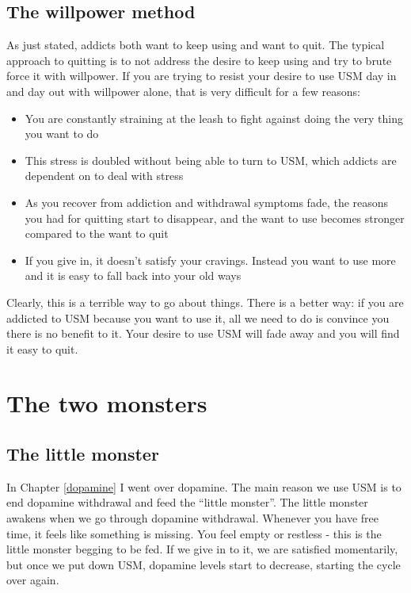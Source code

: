 \documentclass[
]{book}
\providecommand{\tightlist}{%
  \setlength{\itemsep}{0pt}\setlength{\parskip}{0pt}}
\begin{document}
\section{The willpower method}\label{the-willpower-method}

As just stated, addicts both want to keep using and want to quit. The typical approach to quitting is to not address the desire to keep using and try to brute force it with willpower. If you are trying to resist your desire to use USM day in and day out with willpower alone, that is very difficult for a few reasons:

\begin{itemize}
\tightlist
\item
  You are constantly straining at the leash to fight against doing the very thing you want to do
\item
  This stress is doubled without being able to turn to USM, which addicts are dependent on to deal with stress
\item
  As you recover from addiction and withdrawal symptoms fade, the reasons you had for quitting start to disappear, and the want to use becomes stronger compared to the want to quit
\item
  If you give in, it doesn't satisfy your cravings. Instead you want to use more and it is easy to fall back into your old ways
\end{itemize}

Clearly, this is a terrible way to go about things. There is a better way: if you are addicted to USM because you want to use it, all we need to do is convince you there is no benefit to it. Your desire to use USM will fade away and you will find it easy to quit.

\chapter{The two monsters}\label{two-monsters}

\section{The little monster}\label{the-little-monster}

In Chapter \ref{dopamine} I went over dopamine. The main reason we use USM is to end dopamine withdrawal and feed the ``little monster''. The little monster awakens when we go through dopamine withdrawal. Whenever you have free time, it feels like something is missing. You feel empty or restless - this is the little monster begging to be fed. If we give in to it, we are satisfied momentarily, but once we put down USM, dopamine levels start to decrease, starting the cycle over again.
\end{document}
